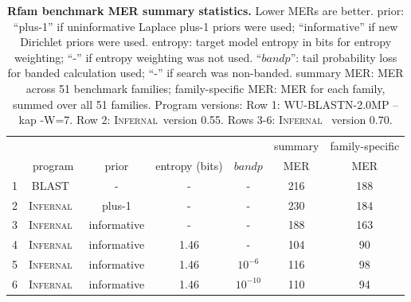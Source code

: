 \documentclass[11pt]{article}
\def\infernal{\textsc{Infernal}~}
\def\blast{\textsc{BLAST}~}
\begin{document}
\begin{table}[htb]
\begin{center}
\begin{tabular}{ccccccc} 
\multicolumn{1}{c}{} & \multicolumn{1}{c}{} & \multicolumn{1}{c}{} &
\multicolumn{1}{c}{} & \multicolumn{1}{c}{} &
\multicolumn{1}{c}{summary} & \multicolumn{1}{c}{family-specific} \\
\multicolumn{1}{c}{} & \multicolumn{1}{c}{program} &
\multicolumn{1}{c}{prior} & \multicolumn{1}{c}{entropy (bits)} &
\multicolumn{1}{c}{$bandp$} & \multicolumn{1}{c}{MER} &
\multicolumn{1}{c}{MER} \\ \hline
1 & \blast & - & - & - & 216 & 188 \\
2 & \infernal & plus-1 & - & - & 230 & 184 \\
3 & \infernal & informative & - & - & 188 & 163 \\
4 & \infernal & informative & 1.46 & - & 104 & 90 \\
5 & \infernal & informative & 1.46 & $10^{-6}$ & 116 & 98 \\
6 & \infernal & informative & 1.46 & $10^{-10}$ & 110 & 94 \\ 
\end{tabular}
\end{center}
\caption{\textbf{Rfam benchmark MER summary statistics.}
  Lower MERs are better. prior: ``plus-1'' if uninformative Laplace plus-1 priors were
  used; ``informative'' if new Dirichlet priors were used.
  entropy: target model entropy in bits for entropy weighting; ``-''
  if entropy weighting was not used.
  ``$bandp$'': tail probability loss for banded calculation used; ``-'' if search
  was non-banded. summary MER: MER across 51 benchmark
  families; family-specific MER: MER for each family, summed
  over all 51 families. Program versions: Row 1: WU-BLASTN-2.0MP
  --kap -W=7. Row 2: \infernal version 0.55. Rows 3-6: \infernal
  version 0.70.}
\label{tbl:rmarkmerlist}
\end{table}
\end{document}
